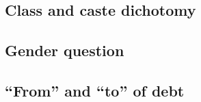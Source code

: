 \documentclass[a4paper, 11pt, onecolumn]{article}
\begin{document}
	
	
	
	\subsection{Class and caste dichotomy}
	\subsection{Gender question}
	
	
	\subsection{``From'' and ``to'' of debt}
















\end{document}
